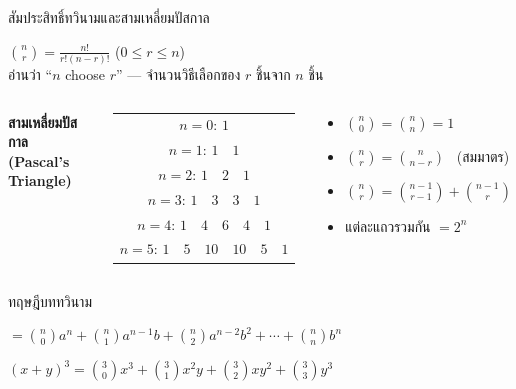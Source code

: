 \documentclass[11pt, aspectratio=169]{beamer}
\begin{document}
\begin{frame}{สัมประสิทธิ์ทวินามและสามเหลี่ยมปัสกาล}
  \begin{explanation}
    $\displaystyle\binom{n}{r} = \frac{n!}{r!(n-r)!}$ \quad ($0 \leq r \leq n$)
    \\ อ่านว่า ``$n$ choose $r$'' — จำนวนวิธีเลือกของ $r$ ชิ้นจาก $n$ ชิ้น
  \end{explanation}

  \begin{columns}[T]
      \centering
      \textbf{สามเหลี่ยมปัสกาล (Pascal's Triangle)}

      \begin{tabular}{c}
        $n=0$: \quad $1$ \\
        $n=1$: \quad $1 \quad 1$ \\
        $n=2$: \quad $1 \quad 2 \quad 1$ \\
        $n=3$: \quad $1 \quad 3 \quad 3 \quad 1$ \\
        $n=4$: \quad $1 \quad 4 \quad 6 \quad 4 \quad 1$ \\
        $n=5$: \quad $1 \quad 5 \quad 10 \quad 10 \quad 5 \quad 1$
      \end{tabular}

      \begin{explanation}[สมบัติ]
        \begin{itemize}
          \item $\binom{n}{0} = \binom{n}{n} = 1$
          \item $\binom{n}{r} = \binom{n}{n-r}$ \ (สมมาตร)
          \item $\binom{n}{r} = \binom{n-1}{r-1} + \binom{n-1}{r}$
          \item แต่ละแถวรวมกัน $= 2^n$
        \end{itemize}
      \end{explanation}
  \end{columns}
\end{frame}\begin{frame}{ทฤษฎีบททวินาม}
  \begin{explanation}[ทฤษฎีบท]

    \medskip
    $= \binom{n}{0}a^n + \binom{n}{1}a^{n-1}b + \binom{n}{2}a^{n-2}b^2 + \cdots + \binom{n}{n}b^n$
  \end{explanation}

  \begin{exambox}[ตัวอย่าง: $(x+y)^3$]
    $(x+y)^3 = \binom{3}{0}x^3 + \binom{3}{1}x^2y + \binom{3}{2}xy^2 + \binom{3}{3}y^3$


\end{exambox}
\end{frame}
\end{document}
